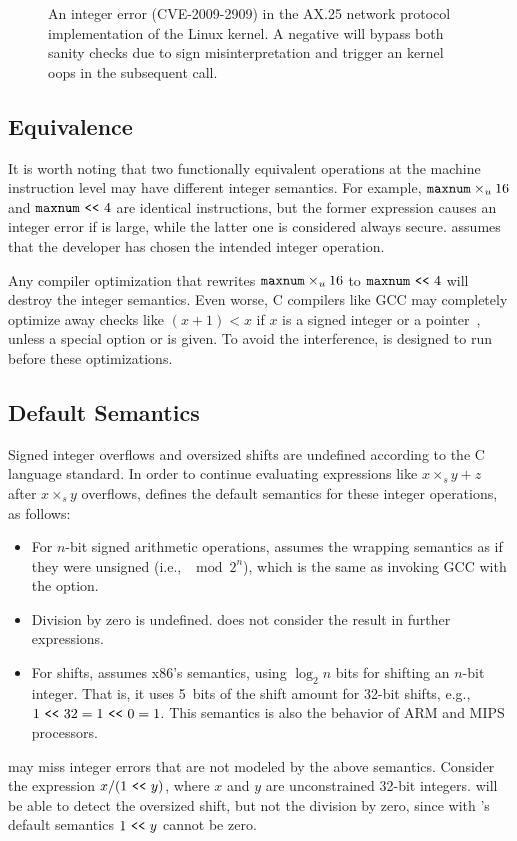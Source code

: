 \begin{figure}
\centering

\vspace{-1em}
\caption{An integer error (CVE-2009-2909) in the AX.25
network protocol implementation of the Linux kernel.  A negative
 will bypass both sanity checks due to sign misinterpretation
 and trigger an kernel
oops in the subsequent  call.}
\label{f:ax25-sign}
\end{figure}

\subsection{Equivalence}
\label{s:sema:eqv}

It is worth noting that two functionally equivalent operations at
the machine instruction level may have different integer semantics.
For example, $\texttt{maxnum}\times_u 16$ and $\texttt{maxnum} \ \texttt{<}\texttt{<}\  4$ are
identical instructions, but the former expression causes an integer
error if  is large, while the latter one is considered
always secure.  \sys assumes that the developer has chosen the
intended integer operation.

Any compiler optimization that rewrites
$\texttt{maxnum}\times_u 16$ to $\texttt{maxnum} \ \texttt{<}\texttt{<}\  4$ will destroy the
integer semantics.  Even worse, C compilers like GCC may completely
optimize away checks like $(x + 1) < x$ if $x$ is a signed integer
or a pointer~\cite{gcc:signed-overflow,us-cert:gcc}, unless a special
option  or  is
given.  To avoid the interference, \sys is designed to run before
these optimizations.

\subsection{Default Semantics}
\label{s:sema:def}

Signed integer overflows and oversized shifts are undefined according
to the C language standard.  In order to continue evaluating
expressions like $x \times_s y + z$ after $x \times_s y$ overflows,
\sys defines the default semantics for these integer operations, as
follows:
\begin{itemize}
\item
For $n$-bit signed arithmetic operations, \sys assumes the wrapping
semantics as if they were unsigned (i.e., $\mod{2^n}$), which is
the same as invoking GCC with the  option.
\item
Division by zero is undefined.  \sys does not consider the result
in further expressions.
\item
For shifts, \sys assumes x86's semantics, using $\log_2 n$ bits for
shifting an $n$-bit integer.  That is, it uses 5~bits of the shift
amount for 32-bit shifts, e.g., $1 \ \texttt{<}\texttt{<}\  32 = 1 \ \texttt{<}\texttt{<}\  0 = 1$.  This semantics
is also the behavior of ARM and MIPS processors.
\end{itemize}
\sys may miss integer errors that are not modeled by the above
semantics.  Consider the expression $x / (1 \ \texttt{<}\texttt{<}\  y)$, where $x$ and
$y$ are unconstrained 32-bit integers.  \sys will be able to detect
the oversized shift, but not the division by zero, since
with \sys's default semantics $1 \ \texttt{<}\texttt{<}\  y$ cannot be zero.

